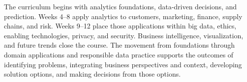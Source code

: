 \begin{visualexplanation}
The curriculum begins with analytics foundations, data-driven decisions, and prediction. Weeks 4--8 apply analytics to customers, marketing, finance, supply chains, and risk. Weeks 9--12 place those applications within big data, ethics, enabling technologies, privacy, and security. Business intelligence, visualization, and future trends close the course. The movement from foundations through domain applications and responsible data practice supports the outcomes of identifying problems, integrating business perspectives and context, developing solution options, and making decisions from those options.
\end{visualexplanation}